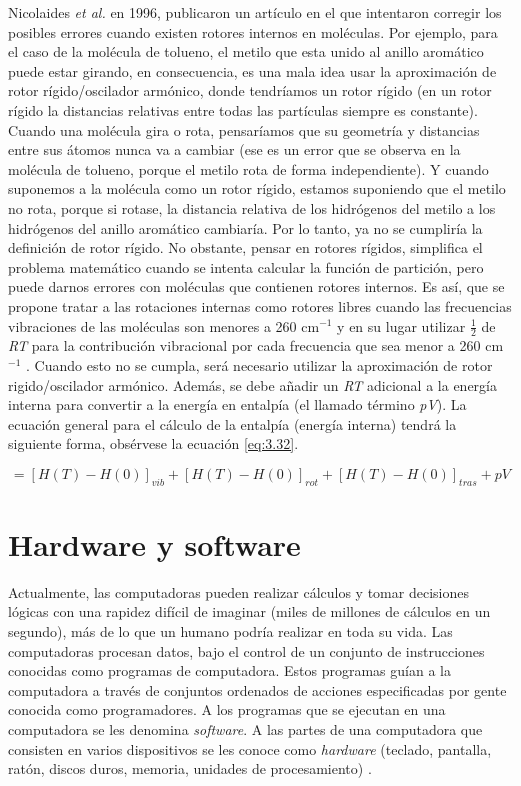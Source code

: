  
Nicolaides \textit{et al.} en 1996, publicaron un artículo en el que intentaron corregir los posibles errores cuando existen rotores internos en moléculas. Por ejemplo, para el caso de la molécula de tolueno, el metilo que esta unido al anillo aromático puede estar girando, en consecuencia, es una mala idea usar la aproximación de rotor rígido/oscilador armónico, donde tendríamos un rotor rígido (en un rotor rígido la distancias relativas entre todas las partículas siempre es constante). Cuando una molécula gira o rota, pensaríamos que su geometría y distancias entre sus átomos nunca va a cambiar (ese es un error que se observa en la molécula de tolueno, porque el metilo rota de forma independiente). Y cuando suponemos a la molécula como un rotor rígido, estamos suponiendo que el metilo no rota, porque si rotase, la distancia relativa de los hidrógenos del metilo a los hidrógenos del anillo aromático cambiaría. Por lo tanto, ya no se cumpliría la definición de rotor rígido. No obstante, pensar en rotores rígidos, simplifica el problema matemático cuando se intenta calcular la función de partición, pero puede darnos errores con moléculas que contienen rotores internos. Es así, que se propone tratar a las rotaciones internas como rotores libres cuando las frecuencias vibraciones de las moléculas son menores a 260 cm$^{-1}$ y en su lugar utilizar $\frac{1}{2}$ de \textit{RT} para la contribución vibracional por cada frecuencia que sea menor a 260 cm$^{-1}$ \cite{Nicolaides1996}. Cuando esto no se cumpla, será necesario utilizar la aproximación de rotor rigido/oscilador armónico. Además, se debe añadir un \textit{RT} adicional a la energía interna para convertir a la energía en entalpía (el llamado término \textit{pV}). La ecuación general para el cálculo de la entalpía (energía interna) tendrá la siguiente forma, obsérvese la ecuación \ref{eq:3.32}.

\begin{equation}
[H(298.15)-H(0)] = [H(T)-H(0)]_{vib}+[H(T)-H(0)]_{rot}+[H(T)-H(0)]_{tras} + pV
\label{eq:3.32}
\end{equation}

\newpage

\section{Hardware y software}

Actualmente, las computadoras pueden realizar cálculos y tomar decisiones lógicas con una rapidez difícil de imaginar 
(miles de millones de cálculos en un segundo), más de lo que un humano podría realizar en toda su vida. 
Las computadoras procesan datos, bajo el control de un conjunto de instrucciones conocidas como programas de computadora. 
Estos programas guían a la computadora a través de conjuntos ordenados de acciones especificadas por gente conocida como programadores. 
A los programas que se ejecutan en una computadora se les denomina \textit{software}. A las partes de una computadora que consisten en varios dispositivos se les conoce como \textit{hardware} (teclado, pantalla, ratón, discos duros, memoria, unidades de procesamiento) \cite{Deitel2014}. 

